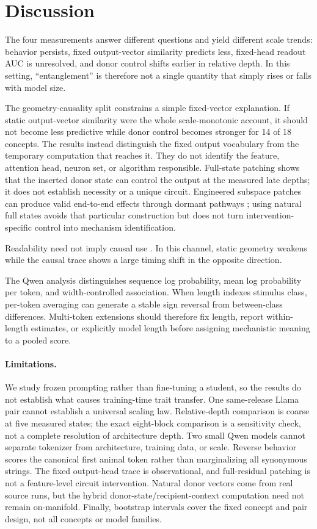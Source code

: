 \documentclass[letterpaper]{article}
\begin{document}
\section{Discussion}

The four measurements answer different questions and yield different scale
trends: behavior persists, fixed output-vector similarity predicts less,
fixed-head readout AUC is unresolved, and donor control shifts earlier in
relative depth. In this setting, ``entanglement'' is therefore not a single
quantity that simply rises or falls with model size.

The geometry-causality split constrains a simple fixed-vector explanation. If
static output-vector similarity were the whole scale-monotonic account, it
should not become less predictive while donor control becomes stronger for 14
of 18 concepts. The results instead distinguish the fixed output vocabulary
from the temporary computation that reaches it. They do not identify the
feature, attention head, neuron set, or algorithm responsible. Full-state
patching shows that the inserted donor state can control the output at the
measured late depths; it does not establish necessity or a unique circuit.
Engineered subspace patches can produce valid end-to-end effects through
dormant pathways \citep{makelov2024subspace}; using natural full states avoids
that particular construction but does not turn intervention-specific control
into mechanism identification.

Readability need not imply causal use
\citep{belinkov2022probing,ma2026plan}. In this channel, static geometry
weakens while the causal trace shows a large timing shift in the opposite
direction.

The Qwen analysis distinguishes sequence log probability, mean log probability
per token, and width-controlled association. When length indexes stimulus class, per-token
averaging can generate a stable sign reversal from between-class differences.
Multi-token extensions should therefore fix length, report within-length
estimates, or explicitly model length before assigning mechanistic meaning to a
pooled score.

\paragraph{Limitations.}
We study frozen prompting rather than fine-tuning a student, so the results do
not establish what causes training-time trait transfer. One same-release Llama
pair cannot establish a universal scaling law. Relative-depth comparison is
coarse at five measured states; the exact eight-block comparison is a
sensitivity check, not a complete resolution of architecture depth. Two small
Qwen models cannot separate tokenizer from architecture, training data, or
scale. Reverse behavior scores the canonical first animal token rather than
marginalizing all synonymous strings. The fixed output-head trace is
observational, and full-residual patching is not a feature-level circuit
intervention. Natural donor vectors come from real source runs, but the hybrid
donor-state/recipient-context computation need not remain on-manifold. Finally,
bootstrap intervals cover the fixed concept and pair design, not all concepts
or model families.
\end{document}
